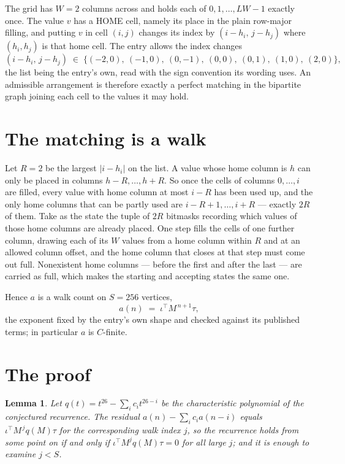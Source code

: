 \documentclass[11pt,a4paper]{article}
\theoremstyle{plain}
\newtheorem{lemma}[theorem]{Lemma}
\theoremstyle{definition}
\begin{document}
The grid has $W=2$ columns across and holds each of $0,1,\dots,LW-1$ exactly once. The value
$v$ has a HOME cell, namely its place in the plain row-major filling, and putting $v$ in cell
$(i,j)$ changes its index by $(i-h_i,\,j-h_j)$ where $(h_i,h_j)$ is that home cell. The entry
allows the index changes
\[
(i-h_i,\,j-h_j)\;\in\;\{(-2,0),\ (-1,0),\ (0,-1),\ (0,0),\ (0,1),\ (1,0),\ (2,0)\},
\]
the list being the entry's own, read with the sign convention its wording uses. An admissible
arrangement is therefore exactly a perfect matching in the bipartite graph joining each cell to
the values it may hold.

\section{The matching is a walk}

Let $R=2$ be the largest $|i-h_i|$ on the list. A value whose home column is $h$ can only be
placed in columns $h-R,\dots,h+R$. So once the cells of columns $0,\dots,i$ are filled, every
value with home column at most $i-R$ has been used up, and the only home columns that can be
partly used are $i-R+1,\dots,i+R$ --- exactly $2R$ of them. Take as the state the tuple of
$2R$ bitmasks recording which values of those home columns are already placed. One step fills
the cells of one further column, drawing each of its $W$ values from a home column within $R$
and at an allowed column offset, and the home column that closes at that step must come out
full. Nonexistent home columns --- before the first and after the last --- are carried as
full, which makes the starting and accepting states the same one.

Hence $a$ is a walk count on $S=256$ vertices,
\[
a(n)\;=\;\iota^{\!\top}M^{\,n+1}\tau ,
\]
the exponent fixed by the entry's own shape and checked against its published terms; in
particular $a$ is $C$-finite.

\section{The proof}

\begin{lemma}\label{lem:crit}
Let $q(t)=t^{26}-\sum_i c_it^{26-i}$ be the characteristic polynomial of the
conjectured recurrence. The residual $a(n)-\sum_ic_ia(n-i)$ equals
$\iota^{\!\top}M^{\,j}q(M)\tau$ for the corresponding walk index $j$, so the recurrence
holds from some point on if and only if $\iota^{\!\top}M^{j}q(M)\tau=0$ for all large $j$;
and it is enough to examine $j<S$.
\end{lemma}
\end{document}

